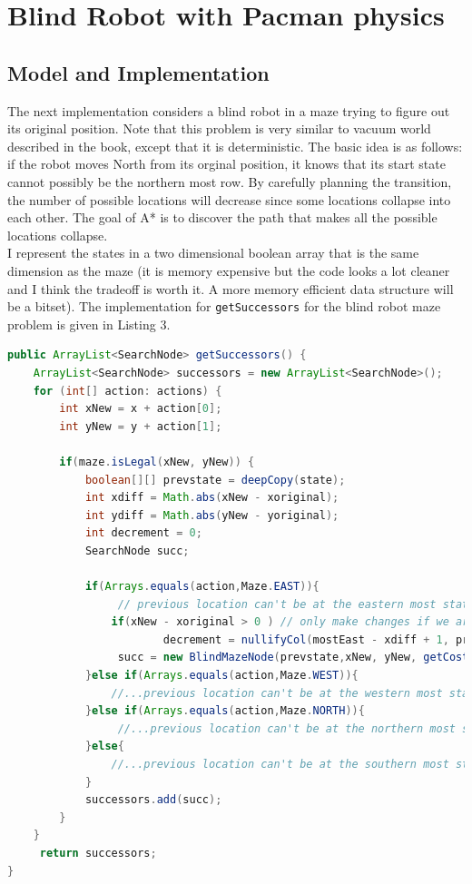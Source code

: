 \documentclass[9.5pt]{extarticle}
\begin{document}
\section{Blind Robot with Pacman physics}
\subsection{Model and Implementation}

The next implementation considers a blind robot in a maze trying to figure out its original position. Note that this problem is very similar to vacuum world described in the book, except that it is deterministic. The basic idea is as follows: if the robot moves North from its orginal position, it knows that its start state cannot possibly be the northern most row. By carefully planning the transition, the number of possible locations will decrease since some locations collapse into each other. The goal of A* is to discover the path that makes all the possible locations collapse.\\

I represent the states in a two dimensional boolean array that is the same dimension as the maze (it is memory expensive but the code looks a lot cleaner and I think the tradeoff is worth it. A more memory efficient data structure will be a bitset). The implementation for \verb`getSuccessors` for the blind robot maze problem is given in Listing 3.

\begin{lstlisting}[language=java,caption={Java code for getSuccessors blind robot maze problem}]
public ArrayList<SearchNode> getSuccessors() {
	ArrayList<SearchNode> successors = new ArrayList<SearchNode>();
	for (int[] action: actions) {
		int xNew = x + action[0];
		int yNew = y + action[1];

		if(maze.isLegal(xNew, yNew)) {
			boolean[][] prevstate = deepCopy(state);
			int xdiff = Math.abs(xNew - xoriginal);
			int ydiff = Math.abs(yNew - yoriginal);
			int decrement = 0;
			SearchNode succ;

			if(Arrays.equals(action,Maze.EAST)){
				 // previous location can't be at the eastern most state
				if(xNew - xoriginal > 0 ) // only make changes if we are not backtracking
						decrement = nullifyCol(mostEast - xdiff + 1, prevstate);
				 succ = new BlindMazeNode(prevstate,xNew, yNew, getCost() + 1.0,numPossible-decrement, "E");
			}else if(Arrays.equals(action,Maze.WEST)){
				//...previous location can't be at the western most state (refer to BlindMazeProblem.java)
			}else if(Arrays.equals(action,Maze.NORTH)){
				 //...previous location can't be at the northern most state (refer to BlindMazeProblem.java)
			}else{
				//...previous location can't be at the southern most state (refer to BlindMazeProblem.java)
			}
			successors.add(succ);
		}
	}
	 return successors;
}
\end{lstlisting}
\end{document}
